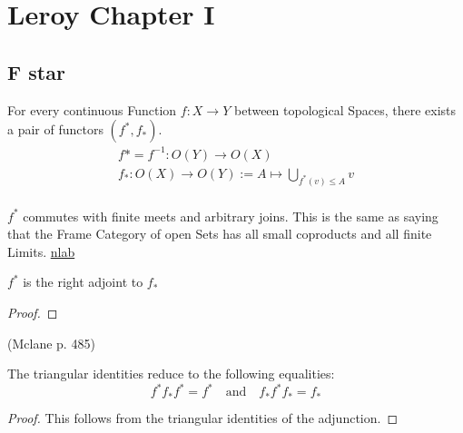 \chapter{Leroy Chapter I}


\section{F star}

\begin{definition}[$f^*$ and $f_*$]
    \label{def:f_star}
    \leanok
    For every continuous Function $f : X \rightarrow Y$ between topological Spaces, there exists a pair of functors $(f^*,f_*)$.
    \begin{gather*}
        f* = f^{-1} : O(Y) \rightarrow O(X)\\
        f_* : O(X) \rightarrow O(Y) := A \mapsto \bigcup_{f^*(v) \le A} v\\
    \end{gather*}
\end{definition}

\begin{lemma}[$f^*$ commutes]
    \label{lem:f_star_comm}
    $f^*$ commutes with finite meets and arbitrary joins. This is the same as saying that the Frame Category of open Sets has all small coproducts and all finite Limits. \href{https://ncatlab.org/nlab/show/frame}{nlab}
\end{lemma}


\begin{lemma}[$f^* \dashv f_*$]
    \label{lem:f_star_adj}
    \leanok
    $f^*$ is the right adjoint to $f_*$
\end{lemma}
\begin{proof}
    \leanok
\end{proof}

\begin{lemma}[triangle]
(Mclane p. 485)

    The triangular identities reduce to the following equalities:
    \[f^*f_*f^* = f^* \quad \text{and} \quad f_*f^*f_* = f_*\]
    \leanok
    \label{lem:triangle}
\end{lemma}
\begin{proof}
    This follows from the triangular identities of the adjunction.
    \leanok
\end{proof}


